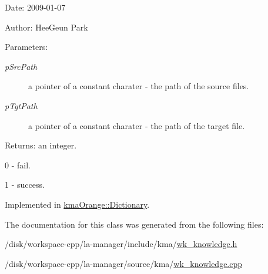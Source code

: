 \begin{Desc}
\item[Date:]2009-01-07 \end{Desc}
\begin{Desc}
\item[Author:]HeeGeun Park \end{Desc}
\begin{Desc}
\item[Parameters:]
\begin{description}
\item[{\em pSrcPath}]a pointer of a constant charater - the path of the source files. \item[{\em pTgtPath}]a pointer of a constant charater - the path of the target file. \end{description}
\end{Desc}
\begin{Desc}
\item[Returns:]an integer.\par
 0 - fail.\par
 1 - success. \end{Desc}


Implemented in \hyperlink{classkmaOrange_1_1Dictionary_3f754de6a90c39753b6620f089be7b85}{kmaOrange::Dictionary}.

The documentation for this class was generated from the following files:\begin{CompactItemize}
\item 
/disk/workspace-cpp/la-manager/include/kma/\hyperlink{wk__knowledge_8h}{wk\_\-knowledge.h}\item 
/disk/workspace-cpp/la-manager/source/kma/\hyperlink{wk__knowledge_8cpp}{wk\_\-knowledge.cpp}\end{CompactItemize}
